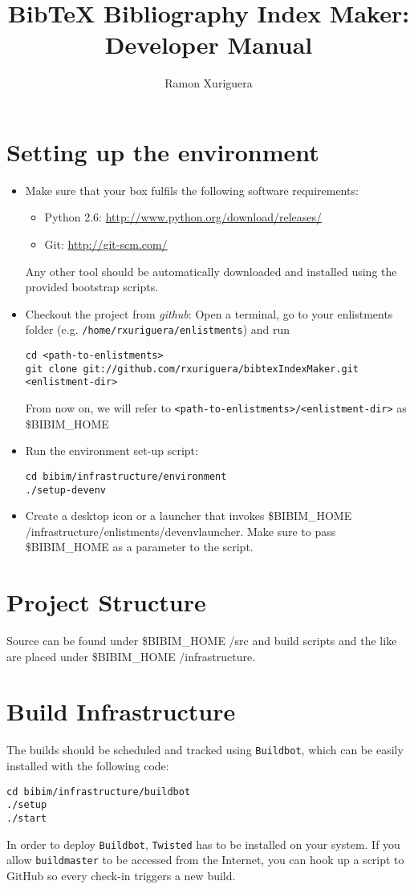\documentclass[a4paper,oneside]{article}
\title{BibTeX Bibliography Index Maker: Developer Manual}
\author{Ramon Xuriguera}
\date{}
\newcommand{\bimhome}{\$BIBIM\_HOME }
\begin{document}
\maketitle

\section{Setting up the environment}
\begin{itemize}
    \item{}
    Make sure that your box fulfils the following software requirements:
    \begin{itemize}
        \item{Python 2.6: }
            \url{http://www.python.org/download/releases/}
        \item{Git: }
            \url{http://git-scm.com/}
    \end{itemize}
    Any other tool should be automatically downloaded and installed using the provided bootstrap scripts.

    \item{Checkout the project from \textit{github}:}
    Open a terminal, go to your enlistments folder (e.g. \texttt{/home/rxuriguera/enlistments}) and run
    \begin{lstlisting}
cd <path-to-enlistments>
git clone git://github.com/rxuriguera/bibtexIndexMaker.git <enlistment-dir>
    \end{lstlisting}
    From now on, we will refer to \texttt{<path-to-enlistments>/<enlistment-dir>} as \bimhome

    \item{}
    Run the environment set-up script:
    \begin{lstlisting}
cd bibim/infrastructure/environment
./setup-devenv
    \end{lstlisting}

    \item{}
    Create a desktop icon or a launcher that invokes \bimhome/infrastructure/enlistments/devenvlauncher. Make sure to pass \bimhome as a parameter to the script.
\end{itemize}

\section{Project Structure}
Source can be found under \bimhome/src and build scripts and the like are placed under \bimhome/infrastructure.

\section{Build Infrastructure}
The builds should be scheduled and tracked using \texttt{Buildbot}, which can be easily installed with the following code:
    \begin{lstlisting}
cd bibim/infrastructure/buildbot
./setup
./start
    \end{lstlisting}
In order to deploy \texttt{Buildbot}, \texttt{Twisted} has to be installed on your system. If you allow \texttt{buildmaster} to be accessed from the Internet, you can hook up a script to GitHub so every check-in triggers a new build.
\end{document}
